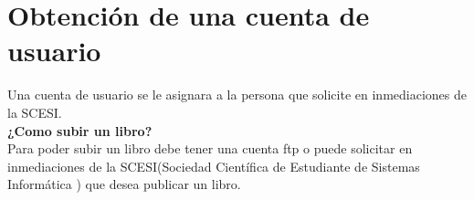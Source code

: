 \documentclass[12pt,letterpaper,oneside]{book}
\begin{document}
\section{Obtención de una cuenta de usuario}
Una cuenta de usuario se le asignara a la persona que solicite en inmediaciones de la SCESI.\\
{\bf ¿Como subir un libro?}\\
Para poder subir un libro debe tener una cuenta ftp o puede solicitar en inmediaciones de la SCESI(Sociedad Científica de Estudiante de Sistemas Informática ) que desea publicar un libro. 
\end{document}
